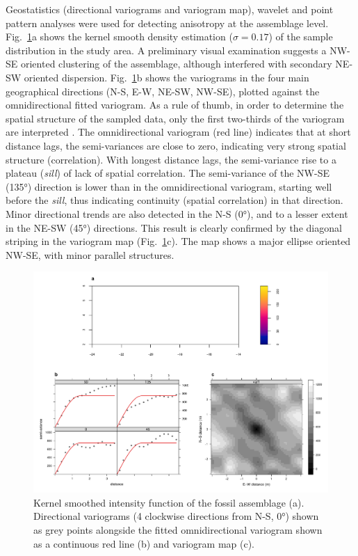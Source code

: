 \documentclass[review,times,authoryear]{elsarticle} %
\begin{document}
Geostatistics (directional variograms and variogram map), wavelet and point pattern analyses were used for detecting anisotropy at the assemblage level. Fig.~\ref{fig:gstat}a shows the kernel smooth density estimation ($\sigma=0.17$) of the sample distribution in the study area. A preliminary visual examination suggests a NW-SE oriented clustering of the assemblage, although interfered with secondary NE-SW oriented dispersion. Fig.~\ref{fig:gstat}b shows the variograms in the four main geographical directions (N-S, E-W, NE-SW, NW-SE), plotted against the omnidirectional fitted variogram. As a rule of thumb, in order to determine the spatial structure of the sampled data, only the first two-thirds of the variogram are interpreted \citep{Dale2014}. The omnidirectional variogram (red line) indicates that at short distance lags, the semi-variances are close to zero, indicating very strong spatial structure (correlation). With longest distance lags, the semi-variance rise to a plateau (\emph{sill}) of lack of spatial correlation. The semi-variance of the NW-SE (135°) direction is lower than in the omnidirectional variogram, starting well before the \emph{sill}, thus indicating continuity (spatial correlation) in that direction. Minor directional trends are also detected in the N-S (0°), and to a lesser extent in the NE-SW (45°) directions. %
This result is clearly confirmed by the diagonal striping in the variogram map (Fig.~\ref{fig:gstat}c). The map shows a major ellipse oriented NW-SE, with minor parallel structures. %

\begin{figure}
  \centering
  \includegraphics[width=1\textwidth]{./artwork/Fig:gstat_.pdf}
  \caption{Kernel smoothed intensity function of the fossil assemblage (a). Directional variograms (4 clockwise directions from N-S, 0°) shown as grey points alongside the fitted omnidirectional variogram shown as a continuous red line (b) and variogram map (c).}
  \label{fig:gstat}
\end{figure}
\end{document}
